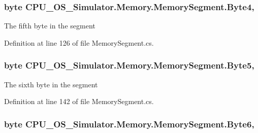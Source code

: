 \subsubsection[{Byte4}]{\setlength{\rightskip}{0pt plus 5cm}byte C\+P\+U\+\_\+\+O\+S\+\_\+\+Simulator.\+Memory.\+Memory\+Segment.\+Byte4\hspace{0.3cm}{\ttfamily [get]}, {\ttfamily [set]}}\label{class_c_p_u___o_s___simulator_1_1_memory_1_1_memory_segment_acc659c001dde3c6f6b0875df933b5bec}


The fifth byte in the segment 



Definition at line 126 of file Memory\+Segment.\+cs.

\hypertarget{class_c_p_u___o_s___simulator_1_1_memory_1_1_memory_segment_a8ef49453e406cd41eacc4e2ef16a8420}{}
\subsubsection[{Byte5}]{\setlength{\rightskip}{0pt plus 5cm}byte C\+P\+U\+\_\+\+O\+S\+\_\+\+Simulator.\+Memory.\+Memory\+Segment.\+Byte5\hspace{0.3cm}{\ttfamily [get]}, {\ttfamily [set]}}\label{class_c_p_u___o_s___simulator_1_1_memory_1_1_memory_segment_a8ef49453e406cd41eacc4e2ef16a8420}


The sixth byte in the segment 



Definition at line 142 of file Memory\+Segment.\+cs.

\hypertarget{class_c_p_u___o_s___simulator_1_1_memory_1_1_memory_segment_ade6f265c081bbfd184e344cb8af45c0b}{}
\subsubsection[{Byte6}]{\setlength{\rightskip}{0pt plus 5cm}byte C\+P\+U\+\_\+\+O\+S\+\_\+\+Simulator.\+Memory.\+Memory\+Segment.\+Byte6\hspace{0.3cm}{\ttfamily [get]}, {\ttfamily [set]}}\label{class_c_p_u___o_s___simulator_1_1_memory_1_1_memory_segment_ade6f265c081bbfd184e344cb8af45c0b}


